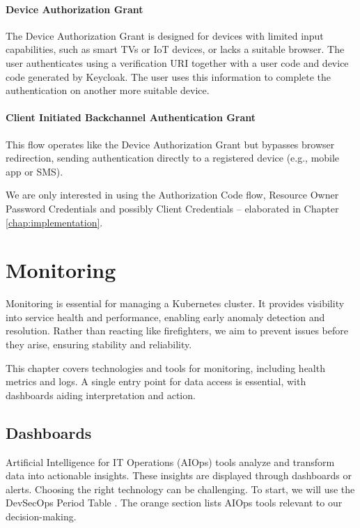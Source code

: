 \paragraph{Device Authorization Grant} The Device Authorization Grant is designed for devices with limited input capabilities, such as smart TVs or IoT devices, or lacks a suitable browser. The user authenticates using a verification URI together with a user code and device code generated by Keycloak. The user uses this information to complete the authentication on another more suitable device.

\paragraph{Client Initiated Backchannel Authentication Grant} This flow operates like the Device Authorization Grant but bypasses browser redirection, sending authentication directly to a registered device (e.g., mobile app or SMS).

We are only interested in using the Authorization Code flow, Resource Owner Password Credentials and possibly Client Credentials -- elaborated in Chapter \ref{chap:implementation}.

\section{Monitoring}

Monitoring is essential for managing a Kubernetes cluster. It provides visibility into service health and performance, enabling early anomaly detection and resolution. Rather than reacting like firefighters, we aim to prevent issues before they arise, ensuring stability and reliability.

This chapter covers technologies and tools for monitoring, including health metrics and logs. A single entry point for data access is essential, with dashboards aiding interpretation and action.

\subsection{Dashboards}
Artificial Intelligence for IT Operations (AIOps) tools analyze and transform data into actionable insights. These insights are displayed through dashboards or alerts. Choosing the right technology can be challenging. To start, we will use the DevSecOps Period Table \parencite{digitalai2025devsecops}. The orange section lists AIOps tools relevant to our decision-making.


